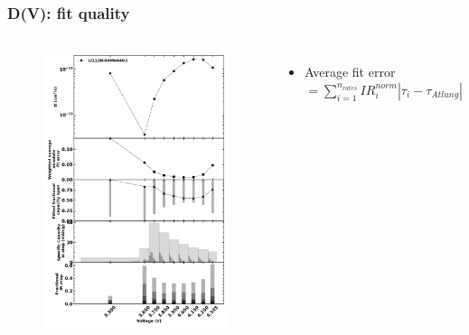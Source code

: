 \documentclass{beamer}
\begin{document}
\begin{frame}
\frametitle{D(V): fit quality}

\begin{columns}
	
	\vspace{-0.5cm}
	\begin{figure}
		\includegraphics[width=0.95\linewidth]{figs/D-V_Li112Ni44Mn44O2_r-05um.jpg}
	\end{figure}
	
	\begin{itemize}
		\item Average fit error $= \sum_{i=1}^{n_{rates}}IR^{norm}_{i}|\tau_i - \tau_{Atlung}|$  
	\end{itemize}
	
\end{columns}

\end{frame}
\end{document}
